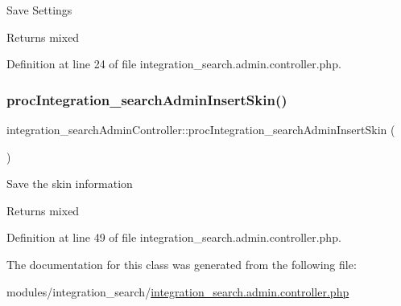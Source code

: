 Save Settings

\begin{DoxyReturn}{Returns}
mixed 
\end{DoxyReturn}


Definition at line 24 of file integration\+\_\+search.\+admin.\+controller.\+php.

\hypertarget{classintegration__searchAdminController_a5bd4a4873fc65c94684beea688448f45}{}\label{classintegration__searchAdminController_a5bd4a4873fc65c94684beea688448f45} 
\subsubsection{\texorpdfstring{proc\+Integration\+\_\+search\+Admin\+Insert\+Skin()}{procIntegration\_searchAdminInsertSkin()}}
{\footnotesize\ttfamily integration\+\_\+search\+Admin\+Controller\+::proc\+Integration\+\_\+search\+Admin\+Insert\+Skin (\begin{DoxyParamCaption}{ }\end{DoxyParamCaption})}

Save the skin information

\begin{DoxyReturn}{Returns}
mixed 
\end{DoxyReturn}


Definition at line 49 of file integration\+\_\+search.\+admin.\+controller.\+php.



The documentation for this class was generated from the following file\+:\begin{DoxyCompactItemize}
\item 
modules/integration\+\_\+search/\hyperlink{integration__search_8admin_8controller_8php}{integration\+\_\+search.\+admin.\+controller.\+php}\end{DoxyCompactItemize}
